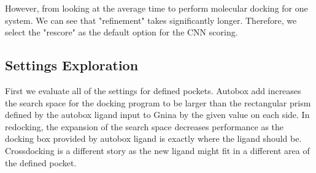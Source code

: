 \documentclass[journal=jcisd8,manuscript=article]{achemso}
\begin{document}
However, from looking at the average time to perform molecular docking for one system. We can see that "refinement" takes significantly longer. Therefore, we select the "rescore" as the default option for the CNN scoring.

\subsection{Settings Exploration}
First we evaluate all of the settings for defined pockets. Autobox add increases the search space for the docking program to be larger than the rectangular prism defined by the autobox ligand input to Gnina by the given value on each side. In redocking, the expansion of the search space decreases performance as the docking box provided by autobox ligand is exactly where the ligand should be. Crossdocking is a different story as the new ligand might fit in a different area of the defined pocket. 
\end{document}
